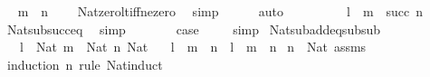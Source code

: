\begin{isabellebody}
\ \isamarkupfalse%
\ {\isachardoublequoteopen}m\ {\isacharminus}{\kern0pt}\ n\ {\isasymnoteq}\ {}{\isachardoublequoteclose}\ \isamarkupfalse%
\ Nat{\isacharunderscore}{\kern0pt}zero{\isacharunderscore}{\kern0pt}lt{\isacharunderscore}{\kern0pt}iff{\isacharunderscore}{\kern0pt}ne{\isacharunderscore}{\kern0pt}zero\ \isamarkupfalse%
\ simp\isanewline
\ \ \ \ \isamarkupfalse%
\ auto\isanewline
\ \ \ \ \isamarkupfalse%
\ \isamarkupfalse%
\ {\isachardoublequoteopen}{\isachardot}{\kern0pt}{\isachardot}{\kern0pt}{\isachardot}{\kern0pt}\ {\isacharequal}{\kern0pt}\ l\ {\isacharplus}{\kern0pt}\ {\isacharparenleft}{\kern0pt}m\ {\isacharminus}{\kern0pt}\ succ\ n{\isacharparenright}{\kern0pt}{\isachardoublequoteclose}\ \isamarkupfalse%
\ Nat{\isacharunderscore}{\kern0pt}sub{\isacharunderscore}{\kern0pt}succ{\isacharunderscore}{\kern0pt}eq\ \isamarkupfalse%
\ simp\isanewline
\ \ \ \ \isamarkupfalse%
\ \isamarkupfalse%
\ {\isacharquery}{\kern0pt}case\ \isacommand{{\isachardot}{\kern0pt}}\isamarkupfalse%
\isanewline
\ \ \isamarkupfalse%
\ simp\isanewline
{}\isamarkupfalse%
%
\endisatagproof
{\isafoldproof}%
%
\isadelimproof
\isanewline
%
\endisadelimproof
\isanewline
{}\isamarkupfalse%
\ Nat{\isacharunderscore}{\kern0pt}sub{\isacharunderscore}{\kern0pt}add{\isacharunderscore}{\kern0pt}eq{\isacharunderscore}{\kern0pt}sub{\isacharunderscore}{\kern0pt}sub{\isacharcolon}{\kern0pt}\isanewline
\ \ \ {\isachardoublequoteopen}l\ {\isacharcolon}{\kern0pt}\ Nat{\isachardoublequoteclose}\ {\isachardoublequoteopen}m\ {\isacharcolon}{\kern0pt}\ Nat{\isachardoublequoteclose}\ {\isachardoublequoteopen}n{\isacharcolon}{\kern0pt}\ Nat{\isachardoublequoteclose}\isanewline
\ \ \ {\isachardoublequoteopen}l\ {\isacharminus}{\kern0pt}\ {\isacharparenleft}{\kern0pt}m\ {\isacharplus}{\kern0pt}\ n{\isacharparenright}{\kern0pt}\ {\isacharequal}{\kern0pt}\ l\ {\isacharminus}{\kern0pt}\ m\ {\isacharminus}{\kern0pt}\ n{\isachardoublequoteclose}\isanewline
%
\isadelimproof
%
\endisadelimproof
%
\isatagproof
{}\isamarkupfalse%
\ {\isacartoucheopen}n\ {\isacharcolon}{\kern0pt}\ Nat{\isacartoucheclose}\ assms\isanewline
{}\isamarkupfalse%
\ {\isacharparenleft}{\kern0pt}induction\ n\ rule{\isacharcolon}{\kern0pt}\ Nat{\isacharunderscore}{\kern0pt}induct{\isacharparenright}{\kern0pt}\isanewline
\ \ \isamarkupfalse%

\end{isabellebody}

